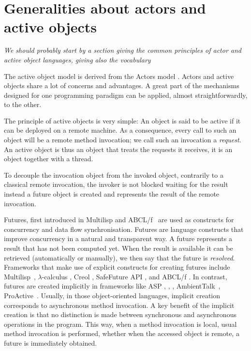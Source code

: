 
\section{Generalities about actors and active objects}
\emph{We should probably start by  a section giving the common principles of actor and 
active object languages, giving also the vocabulary}

The active object model is  derived from the Actors
model \cite{DBLP:conf/birthday/AghaT04,agha97foundation,Agha86-book}. Actors and active objects share
a lot of concerns and advantages. A great part of the mechanisms
designed for one programming paradigm can be applied, almost
straightforwardly, to the other.


The principle of active objects is very simple: An object is said to be
active if it can be deployed on a remote machine. As a consequence,
every call to such an object will be a remote method invocation; we
call such an invocation a \emph{request}. An active object is thus an
object that treats the requests it receives, it is an object together
with a thread.

To decouple the invocation object from the invoked object, contrarily
to a classical remote invocation, the invoker is not blocked waiting
for the result instead a future object is created and represents the
result of the remote invocation.

Futures, first introduced in Multilisp \cite{Halstead85} and ABCL/f~\cite{ABCL1994}
are used as constructs for concurrency and data
flow synchronisation. Futures are language constructs that improve
concurrency in a natural and transparent way. A future represents a
result that has not been computed yet. When the result is available it
can be retrieved (automatically or manually), we then say that the
future is \emph{resolved}.
Frameworks that make use
of explicit constructs for creating futures include
Multilisp~\cite{Halstead85}, $\lambda$-calculus \cite{jlambda-fut06}, Creol
\cite{Elinar2006}, SafeFuture API \cite{SafeFutures05}, and ABCL/f
\cite{ABCL1994}. In contrast, futures are created implicitly in
frameworks like  ASP \cite{CHS:POPL04}, \cite{CHS-IC2008},
\cite{CH-book},
AmbientTalk~\cite{DedeckerCMDM-ecoop06},
ProActive~\cite{CDD:CMST06}.  Usually, in those object-oriented languages,
implicit creation corresponds to asynchronous method invocation. A key
benefit of the implicit creation is that no distinction is made
between synchronous and asynchronous operations in the program.
This way, when a method invocation is local, usual method invocation
is performed, whether when the accessed object is remote, a future is
immediately obtained.

